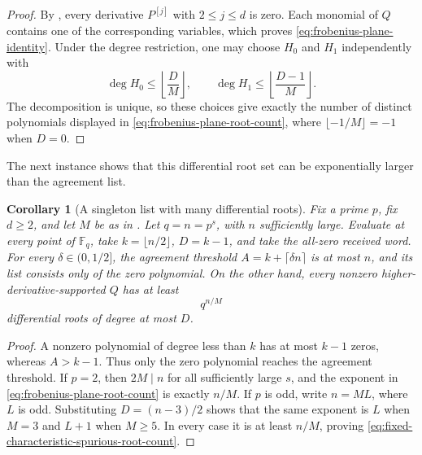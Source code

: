 \documentclass[11pt,letterpaper]{article}
\newtheorem{corollary}[corollary]{Corollary}
\theoremstyle{definition}
\newcommand{\F}{\mathbb{F}}
\begin{document}
\begin{proof}
By , every derivative \(P^{[j]}\) with
\(2\leq j\leq d\) is zero.  Each monomial of \(Q\) contains one of the
corresponding variables, which proves
\eqref{eq:frobenius-plane-identity}.  Under the degree restriction, one may
choose \(H_0\) and \(H_1\) independently with
\[
  \deg H_0\leq\left\lfloor\frac DM\right\rfloor,
  \qquad
  \deg H_1\leq\left\lfloor\frac{D-1}{M}\right\rfloor.
\]
The decomposition is unique, so these choices give exactly the number of
distinct polynomials displayed in \eqref{eq:frobenius-plane-root-count},
where \(\lfloor-1/M\rfloor=-1\) when \(D=0\).
\end{proof}

The next instance shows that this differential root set can be exponentially
larger than the agreement list.

\begin{corollary}[A singleton list with many differential roots]
\label{cor:fixed-characteristic-enumeration-obstruction}
Fix a prime \(p\), fix \(d\geq2\), and let \(M\) be as in
.  Let \(q=n=p^s\), with \(n\)
sufficiently large.  Evaluate at every point of \(\F_q\), take
\(k=\lfloor n/2\rfloor\), \(D=k-1\), and take the all-zero received word.
For every \(\delta\in(0,1/2]\), the agreement threshold
\(A=k+\lceil\delta n\rceil\) is at most \(n\), and its list consists only
of the zero polynomial. On the
other hand, every nonzero higher-derivative-supported \(Q\) has at least
\begin{equation}
  q^{n/M}
  \label{eq:fixed-characteristic-spurious-root-count}
\end{equation}
differential roots of degree at most \(D\).
\end{corollary}

\begin{proof}
A nonzero polynomial of degree less than \(k\) has at most \(k-1\) zeros,
whereas \(A>k-1\).  Thus only the zero polynomial reaches the agreement
threshold.  If \(p=2\), then \(2M\mid n\) for all sufficiently large
\(s\), and the exponent in \eqref{eq:frobenius-plane-root-count} is
exactly \(n/M\).  If \(p\) is odd, write \(n=ML\), where \(L\) is odd.
Substituting \(D=(n-3)/2\) shows that the same exponent is \(L\) when
\(M=3\) and \(L+1\) when \(M\geq5\).  In every case it is at least
\(n/M\), proving \eqref{eq:fixed-characteristic-spurious-root-count}.
\end{proof}
\end{document}
